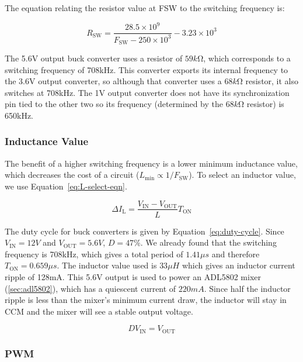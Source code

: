 The equation relating the resistor value at FSW to the switching frequency is:

\begin{equation}
  R_{\text{SW}}=\frac{28.5\times 10^9}{F_{\text{SW}}-250\times 10^3}-3.23\times 10^3
  \label{eq:l7980-freq}
\end{equation}

The 5.6V output buck converter uses a resistor of $59\si{k\ohm}$, which corresponds to a switching
frequency of 708kHz. This converter exports its internal frequency to the 3.6V output converter, so
although that converter uses a $68\si{k\ohm}$ resistor, it also switches at 708kHz. The 1V output
converter does not have its synchronization pin tied to the other two so its frequency (determined
by the $68\si{k\ohm}$ resistor) is 650kHz.

\subsubsection{Inductance Value}
\label{sec:l7980-inductance-value}

The benefit of a higher switching frequency is a lower minimum inductance value, which decreases the
cost of a circuit ($L_{\text{min}}\propto 1/F_{\text{SW}}$). To select an inductor value, we use
Equation~\ref{eq:L-select-eqn}.

\begin{equation}
  \Delta I_{\text{L}} = \frac{V_{\text{IN}}-V_{\text{OUT}}}{L} T_{\text{ON}}
  \label{eq:L-select-eqn}
\end{equation}

The duty cycle for buck converters is given by Equation~\ref{eq:duty-cycle}. Since
$V_{\text{IN}} = 12V$ and $V_{\text{OUT}} = 5.6V$, $D = 47\%$. We already found that the switching
frequency is 708kHz, which gives a total period of $1. 41\si{\mu s}$ and therefore
$T_{\text{ON}} = 0.659\si{\mu s}$. The inductor value used is $33\si{\mu H}$ which gives an inductor
current ripple of 128mA. This 5.6V output is used to power an ADL5802 mixer (\cref{sec:adl5802}),
which has a quiescent current of $220\si{mA}$. Since half the inductor ripple is less than the
mixer's minimum current draw, the inductor will stay in CCM and the mixer will see a stable output
voltage.

\begin{equation} DV_{\text{IN}} = V_{\text{OUT}}
  \label{eq:duty-cycle}
\end{equation}

\subsubsection{PWM}
\label{sec:l7980-pwm}

